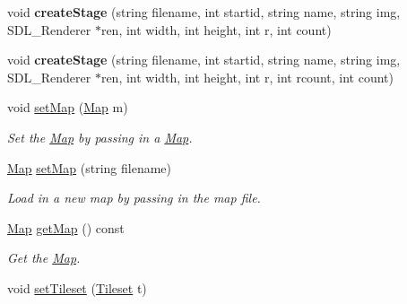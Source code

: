 \begin{DoxyCompactItemize}
\item 
void {\bfseries create\+Stage} (string filename, int startid, string name, string img, S\+D\+L\+\_\+\+Renderer $\ast$ren, int width, int height, int r, int count)\hypertarget{classStage_a8ab003560188a4004ee497fd23692833}{}\label{classStage_a8ab003560188a4004ee497fd23692833}

\item 
void {\bfseries create\+Stage} (string filename, int startid, string name, string img, S\+D\+L\+\_\+\+Renderer $\ast$ren, int width, int height, int r, int rcount, int count)\hypertarget{classStage_a2d9071d75c90883539cd303c128a6b7d}{}\label{classStage_a2d9071d75c90883539cd303c128a6b7d}

\item 
void \hyperlink{classStage_a47a215785ca66ffae354c350aee1800e}{set\+Map} (\hyperlink{classMap}{Map} m)\hypertarget{classStage_a47a215785ca66ffae354c350aee1800e}{}\label{classStage_a47a215785ca66ffae354c350aee1800e}

\begin{DoxyCompactList}\small\item\em Set the \hyperlink{classMap}{Map} by passing in a \hyperlink{classMap}{Map}. \end{DoxyCompactList}\item 
\hyperlink{classMap}{Map} \hyperlink{classStage_a11b7cabe85812fda7513d14d6b21ff6a}{set\+Map} (string filename)\hypertarget{classStage_a11b7cabe85812fda7513d14d6b21ff6a}{}\label{classStage_a11b7cabe85812fda7513d14d6b21ff6a}

\begin{DoxyCompactList}\small\item\em Load in a new map by passing in the map file. \end{DoxyCompactList}\item 
\hyperlink{classMap}{Map} \hyperlink{classStage_a5f18e19add54b6919e9d316e4c0cdaf1}{get\+Map} () const \hypertarget{classStage_a5f18e19add54b6919e9d316e4c0cdaf1}{}\label{classStage_a5f18e19add54b6919e9d316e4c0cdaf1}

\begin{DoxyCompactList}\small\item\em Get the \hyperlink{classMap}{Map}. \end{DoxyCompactList}\item 
void \hyperlink{classStage_a63a19b471f7c54d68f3f7e4419eca8ac}{set\+Tileset} (\hyperlink{classTileset}{Tileset} t)\hypertarget{classStage_a63a19b471f7c54d68f3f7e4419eca8ac}{}\label{classStage_a63a19b471f7c54d68f3f7e4419eca8ac}


\end{DoxyCompactItemize}
